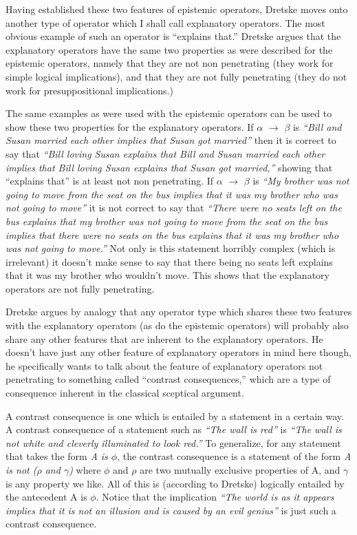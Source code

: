 \documentclass[12pt,letterpaper]{report}
\begin{document}
Having established these two features of epistemic operators, Dretske moves onto another type of operator which I shall call explanatory operators. The most obvious example of such an operator is ``explains that.'' Dretske argues that the explanatory operators have the same two properties as were described for the epistemic operators, namely that they are not non penetrating (they work for simple logical implications), and that they are not fully penetrating (they do not work for presuppositional implications.)

The same examples as were used with the epistemic operators can be used to show these two properties for the explanatory operators. If $\alpha$ $\rightarrow$ $\beta$ is \textit{``Bill and Susan married each other implies that Susan got married''} then it is correct to say that \textit{``Bill loving Susan explains that Bill and Susan married each other implies that Bill loving Susan explains that Susan got married,''} showing that ``explains that'' is at least not non penetrating. If $\alpha$ $\rightarrow$ $\beta$ is \textit{``My brother was not going to move from the seat on the bus implies that it was my brother who was not going to move''} it is not correct to say that \textit{``There were no seats left on the bus explains that my brother was not going to move from the seat on the bus implies that there were no seats on the bus explains that it was my brother who was not going to move.''} Not only is this statement horribly complex (which is irrelevant) it doesn't make sense to say that there being no seats left explains that it was my brother who wouldn't move. This shows that the explanatory operators are not fully penetrating.

Dretske argues by analogy that any operator type which shares these two features with the explanatory operators (as do the epistemic operators) will probably also share any other features that are inherent to the explanatory operators. He doesn't have just any other feature of explanatory operators in mind here though, he specifically wants to talk about the feature of explanatory operators not penetrating to something called ``contrast consequences,'' which are a type of consequence inherent in the classical sceptical argument.

A contrast consequence is one which is entailed by a statement in a certain way. A contrast consequence of a statement such as \textit{``The wall is red''} is \textit{``The wall is not white and cleverly illuminated to look red.''} To generalize, for any statement that takes the form \textit{A is $\phi$}, the contrast consequence is a statement of the form \textit{A is not ($\rho$ and $\gamma$)} where $\phi$ and $\rho$ are two mutually exclusive properties of A, and $\gamma$ is any property we like. All of this is (according to Dretske) logically entailed by the antecedent A is $\phi$. Notice that the implication \textit{``The world is as it appears implies that it is not an illusion and is caused by an evil genius''} is just such a contrast consequence. 
\end{document}
